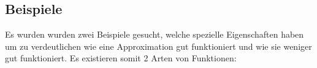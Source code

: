 \subsection{Beispiele}
Es wurden wurden zwei Beispiele gesucht, welche spezielle Eigenschaften haben um zu verdeutlichen wie eine Approximation gut funktioniert und wie sie weniger gut funktioniert. Es existieren somit 2 Arten von Funktionen:
\label{ableitung:subsection:bonorum}

